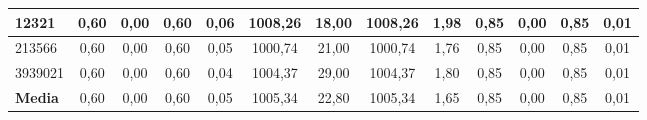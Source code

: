 \documentclass[12pt, spanish]{article}
\begin{document}
\begin{table}[H]
\begin{adjustwidth}{-1cm}{-1cm}
\begin{tabular}{|l|c|c|c|c|c|c|c|c|c|c|c|c|}
12321                                                   & 0,60                         & 0,00                           & 0,60                      & 0,06                   & 1008,26                      & 18,00                          & 1008,26                   & 1,98                   & 0,85                         & 0,00                           & 0,85                      & 0,01                   \\ \hline
213566                                                  & 0,60                         & 0,00                           & 0,60                      & 0,05                   & 1000,74                      & 21,00                          & 1000,74                   & 1,76                   & 0,85                         & 0,00                           & 0,85                      & 0,01                   \\ \hline
3939021                                                 & 0,60                         & 0,00                           & 0,60                      & 0,04                   & 1004,37                      & 29,00                          & 1004,37                   & 1,80                   & 0,85                         & 0,00                           & 0,85                      & 0,01                   \\ \hline
\textbf{Media}                                          & 0,60                         & 0,00                           & 0,60                      & 0,05                   & 1005,34                      & 22,80                          & 1005,34                   & 1,65                   & 0,85                         & 0,00                           & 0,85                      & 0,01                   \\ \hline
\end{tabular}

\end{adjustwidth}

\end{table}
\end{document}

